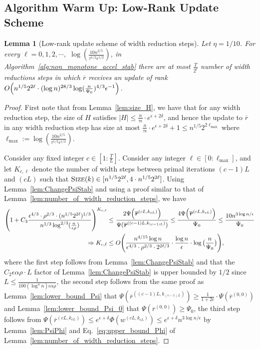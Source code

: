 \documentclass[11pt]{article}
\newtheorem{lemma}[theorem]{Lemma}
\def\implies{\Rightarrow}
\let\originalleft\left
\let\originalright\right
\renewcommand{\left}{\mathopen{}\mathclose\bgroup\originalleft}
\renewcommand{\right}{\aftergroup\egroup\originalright}
\newcommand\rr{\boldsymbol{\mathit{r}}}
\newcommand\ww{\boldsymbol{\mathit{w}}}
\newcommand\rrbar{\overline{\boldsymbol{\mathit{r}}}}
\newcommand{\ov}{\overline}
\begin{document}
\subsection{Algorithm Warm Up: Low-Rank Update Scheme}\label{sec:stability_algo_warm_up}
\begin{lemma}[Low-rank update scheme of width reduction steps]\label{lem:low_rank_update_width_reduction_steps}
Let $\eta = 1/10$. For every $\ell = 0,1, 2, \cdots,$ $ \log(\frac{10 n^{2/5}}{\tau^{1/2} \epsilon^{1/2}})$, in Algorithm~\ref{alg:non_monotone_accel_stab} there are at most $\frac{T}{2^{\ell}}$ number of width reductions steps in which $\ov{\rr}$ receives an update of rank $O\left(n^{1/5} 2^{2 \ell} \cdot (\log n)^{28/3} \log(\frac{n}{\Psi_0})^{4/3} \epsilon^{-1}\right)$. 
\end{lemma}
\begin{proof}
First note that from Lemma~\ref{lem:size_H}, we have that for any width reduction step, the size of $H$ satisfies $|H| \leq \frac{n}{\tau \epsilon} \cdot e^{\epsilon + 2 \delta}$, and hence the update to $\ov{\rr}$ in any width reduction step has size at most $\frac{n}{\tau \epsilon} \cdot e^{\epsilon + 2 \delta} + 1 \leq n^{1/5} 2^{2\ell_{\max}}$ where $\ell_{\max} := \log(\frac{10 n^{2/5}}{\tau^{1/2} \epsilon^{1/2}})$.

Consider any fixed integer $c \in [1:\frac{T}{L}]$. Consider any integer $\ell \in [0:\ell_{\max}]$, and let $K_{c,\ell}$ denote the number of width steps between primal iterations $(c-1)L$ and $(cL)$ such that $\textsc{Size}(k) \in [n^{1/5} 2^{2\ell}, 4 \cdot n^{1/5} 2^{2\ell}]$. Using Lemma~\ref{lem:ChangePsiStab} and using a proof similar to that of Lemma~\ref{lem:number_of_width_reduction_steps}, we have
\begin{align*}
\left( 1 + C_3 \frac{\epsilon^{4/3} \cdot \rho^{2/3} \cdot (n^{1/5} 2^{2 \ell})^{1/3}}{n^{1/3} \log^{2/3}(\frac{n}{\epsilon\rho})} \right)^{K_{c,\ell}} \leq &~ \frac{2 \Psi\left(\ov{\rr}^{(cL,k_{cL})}\right)}{\Psi(\ov{\rr}^{((c-1)L,k_{(c-1)L})})}  
\leq \frac{4 \Psi\left(\ov{\rr}^{(cL,k_{cL})}\right)}{\Psi_0} 
\leq \frac{10 n^{3 \log n / \epsilon}}{\Psi_0} \\
\implies K_{c,\ell} \leq &~ O\left(\frac{n^{4/15} \log n}{\epsilon^{4/3} \cdot \rho^{2/3} \cdot 2^{2\ell/3}} \cdot \frac{\log n}{\epsilon} \cdot \log\big(\frac{n}{\Psi_0}\big)\right),
\end{align*}
where the first step follows from Lemma~\ref{lem:ChangePsiStab} and that the $C_2 \epsilon \alpha \rho \cdot L$ factor of Lemma~\ref{lem:ChangePsiStab} is upper bounded by $1/2$ since $L \leq \frac{1}{100 (\log^4 n) \epsilon \alpha \rho}$, the second step follows from the same proof as Lemma~\ref{lem:lower_bound_Psi} that $\Psi(\ov{\rr}^{((c-1)L,k_{(c-1)L})})\geq \frac{1}{1+2\epsilon}\cdot\Psi(\ov{\rr}^{(0,0)})$ and Lemma~\ref{lem:lower_bound_Psi_0} that $\Psi(\ov{\rr}^{(0,0)}) \geq \Psi_0$, the third step follows from $\Psi(\rrbar^{(cL,k_{cL})}) \leq e^{\epsilon + \delta} \Phi(\ww^{(cL,k_{cL})}) \leq e^{\epsilon + \delta} n^{3 \log n / \epsilon}$ by Lemma~\ref{lem:PsiPhi} and Eq.~\eqref{eq:upper_bound_Phi} of Lemma~\ref{lem:number_of_width_reduction_steps}.



\end{proof}
\end{document}
